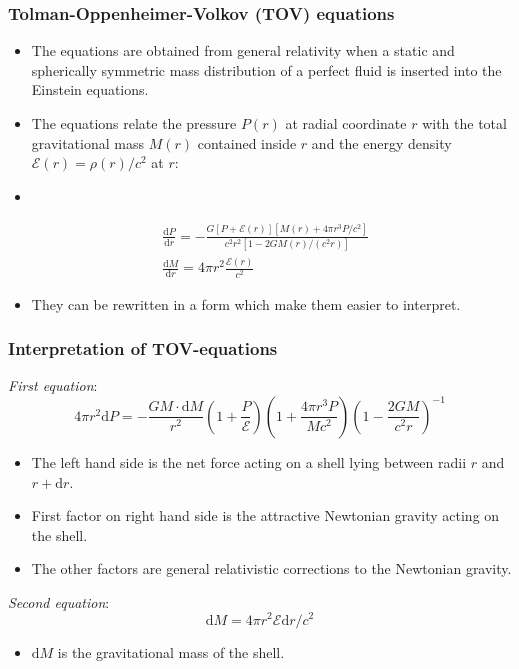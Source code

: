 \documentclass{beamer}
\begin{document}
\begin{frame}

\end{frame}
\begin{frame}
\frametitle{Tolman-Oppenheimer-Volkov (TOV) equations}
\begin{itemize}
    \item The equations are obtained from general relativity when a static and spherically symmetric mass distribution of a perfect fluid is inserted into the Einstein equations.
    \item The equations relate the pressure $P(r)$ at radial coordinate $r$ with the total gravitational mass $M(r)$ contained inside $r$ and the energy density $\mathcal{E}(r)=\rho(r)/c^2$ at $r$:
    \item[]
\end{itemize}
\begin{equation}
    \begin{split}
        &\frac{\text{d}P}{\text{d}r} = -\frac{G\left[P+\mathcal{E}(r)\right]\left[M(r)+4\pi r^3P/c^2\right]}{c^2r^2[1-2GM(r)/(c^2r)]} \\ 
        &\frac{\text{d}M}{\text{d}r} = 4\pi r^2\frac{\mathcal{E}(r)}{c^2}
    \end{split}
\end{equation}
\begin{itemize}
    \item They can be rewritten in a form which make them easier to interpret.
\end{itemize}
\end{frame}

\begin{frame}
\frametitle{Interpretation of TOV-equations}
\textit{First equation}:
\begin{equation*}
    4\pi r^2\text{d}P = -\frac{GM\cdot\text{d}M}{r^2}\left(1+\frac{P}{\mathcal{E}}\right)\left(1+\frac{4\pi r^3P}{Mc^2}\right)\left(1-\frac{2GM}{c^2r}\right)^{-1}
\end{equation*}
\begin{itemize}
    \item The left hand side is the net force acting on a shell lying between radii $r$ and $r+\text{d}r$.
    \item First factor on right hand side is the attractive Newtonian gravity acting on the shell. 
    \item The other factors are general relativistic corrections to the Newtonian gravity.
\end{itemize}
\textit{Second equation}:
\begin{equation*}
    \text{d}M = 4\pi r^2\mathcal{E}\text{d}r/c^2
\end{equation*}
\begin{itemize}
    \item $\text{d}M$ is the gravitational mass of the shell.
\end{itemize}
\end{frame}
\end{document}
